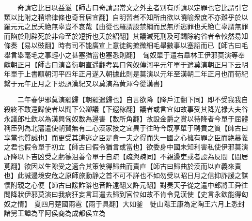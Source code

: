 　　奇請它比日以益滋【師古曰奇請謂常文之外主者别有所請以定罪也它比謂引它類以比附之稍增律條也奇音居宜翻】自明習者不知所由欲以曉喻衆庶不亦難乎於以羅元元之民夭絶無辜豈不哀哉【由從也羅謂設禁綱而民無所逃罪也夭絶亡辜謂無罪而陷於刑辟死於非命至於短折也夭於紹翻】其議減死刑及可蠲除約省者令較然易知條奏【易以豉翻】時有司不能廣宣上意徒鉤摭微細毛舉數事以塞詔而已【師古曰毛舉言舉毫毛之事輕小之甚塞猶當也塞悉則翻】　匈奴單于遣右臯林王伊邪莫演等奉獻朝正月【師古曰演音衍朝直遥翻考異曰匈奴傳河平元年單于遣莫演朝正月下云明年單于上書願朝河平四年正月遂入朝據此則是莫演以元年至漢朝二年正月也而荀紀繫于元年正月之下恐誤漢紀又以莫演為黄渾今從漢書】

　　二年春伊邪莫演罷歸【朝罷遣歸也】自言欲降【降戶江翻下同】即不受我我自殺終不敢還歸使者以聞下公卿議【下遐稼翻】議者或言宜如故事受其降光禄大夫谷永議郎杜欽以為漢興匈奴數為邊害【數所角翻】故設金爵之賞以待降者今單于屈體稱臣列為北藩遣使朝賀無有二心漢家接之宜異于往時今既享單于聘貢之質【師古曰享當也質誠也】而更受其逋逃之臣是貪一夫之得而失一國之心擁有罪之臣而絶慕義之君也假令單于初立【師古曰假令猶言或當也】欲委身中國未知利害私使伊邪莫演詐降以卜吉凶受之虧德沮善令單于自疏【疏與疎同】不親邊吏或者設為反間【間居莧翻】欲因以生隙受之適合其策使得歸曲而責直【師古曰歸曲於漢而以直義來責也】此誠邊境安危之原師旅動静之首不可不詳也不如勿受以昭日月之信抑詐諼之謀懷附親之心便【師古曰諼詐辭也音許遠翻又許元翻】對奏天子從之遣中郎將王舜往問降狀伊邪莫演曰我病狂妄言耳遣去歸到官位如故不肯令見漢使【史言永欽能得匈奴之情】　夏四月楚國雨雹【雨于具翻】大如釜　徙山陽王康為定陶王六月上悉封諸舅王譚為平阿侯商為成都侯立為

